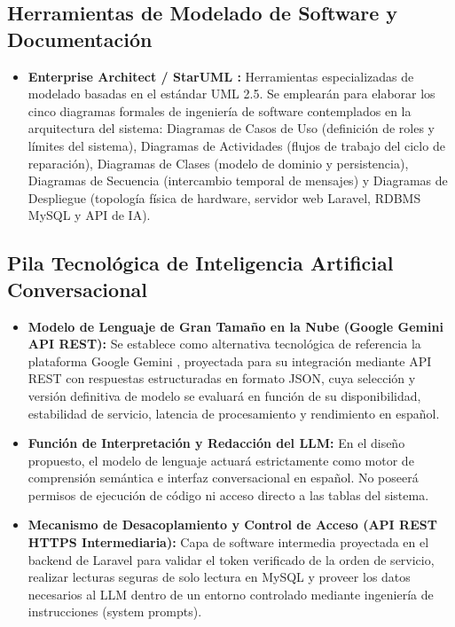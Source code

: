 \subsection{Herramientas de Modelado de Software y Documentación}

\begin{itemize}
    \item \textbf{Enterprise Architect / StarUML \cite{omg2017}:} Herramientas especializadas de modelado basadas en el estándar UML 2.5. Se emplearán para elaborar los cinco diagramas formales de ingeniería de software contemplados en la arquitectura del sistema: Diagramas de Casos de Uso (definición de roles y límites del sistema), Diagramas de Actividades (flujos de trabajo del ciclo de reparación), Diagramas de Clases (modelo de dominio y persistencia), Diagramas de Secuencia (intercambio temporal de mensajes) y Diagramas de Despliegue (topología física de hardware, servidor web Laravel, RDBMS MySQL y API de IA).
\end{itemize}

\subsection{Pila Tecnológica de Inteligencia Artificial Conversacional}

\begin{itemize}
    \item \textbf{Modelo de Lenguaje de Gran Tamaño en la Nube (Google Gemini API REST):} Se establece como alternativa tecnológica de referencia la plataforma Google Gemini \cite{googleai2026}, proyectada para su integración mediante API REST con respuestas estructuradas en formato JSON, cuya selección y versión definitiva de modelo se evaluará en función de su disponibilidad, estabilidad de servicio, latencia de procesamiento y rendimiento en español.
    \item \textbf{Función de Interpretación y Redacción del LLM:} En el diseño propuesto, el modelo de lenguaje actuará estrictamente como motor de comprensión semántica e interfaz conversacional en español. No poseerá permisos de ejecución de código ni acceso directo a las tablas del sistema.
    \item \textbf{Mecanismo de Desacoplamiento y Control de Acceso (API REST HTTPS Intermediaria):} Capa de software intermedia proyectada en el backend de Laravel para validar el token verificado de la orden de servicio, realizar lecturas seguras de solo lectura en MySQL y proveer los datos necesarios al LLM dentro de un entorno controlado mediante ingeniería de instrucciones (system prompts).
\end{itemize}